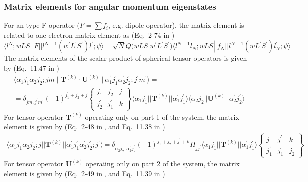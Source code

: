 \documentclass[a4paper,oneside,12pt]{extarticle}
\begin{document}
\subsubsection {Matrix elements for angular momentum eigenstates}
%
For an type-F operator ($F=\sum f_i$, e.g. dipole operator), the matrix element is related to one-electron matrix element as (Eq.~2-74 in \cite{Wybourne})
$$
\langle l^N; wLS || F || l^{N-1}(w^{\prime} L^{\prime} S^{\prime}) l^{\prime}; \psi \rangle = \sqrt{N}
Q(wLS|w^{\prime}L^{\prime} S^{\prime}) \langle l^{N-1} l_N; wLS || f_N || l^{N-1}(wL^{\prime} S^{\prime}) l^{\prime}_N; \psi \rangle
$$
The matrix elements of the scalar product of spherical tensor operators is given by (Eq.~11.47 in \cite{Cowan})
%
\begin{multline}
\langle \alpha_1 j_1 \alpha_2 j_2; jm \mid \mathbf{T}^{(k)}\cdot\mathbf{U}^{(k)} \mid \alpha_1^{\prime} j_1^{\prime} \alpha_2^{\prime} j_2^{\prime}; j^{\prime}m^{\prime} \rangle = \\ =
\delta_{jm, j^{\prime}m^{\prime}} (-1)^{j_1^{\prime} + j_2 + j}
\left \{
\begin{array}{ccc}
j_1 & j_2 & j \\
j_2^{\prime} & j_1^{\prime} & k
\end{array}
\right \}
\langle \alpha_1 j_1 || \mathbf{T}^{(k)} || \alpha_1^{\prime} j_1^{\prime} \rangle
\langle \alpha_2 j_2 || \mathbf{U}^{(k)} || \alpha_2^{\prime} j_2^{\prime} \rangle
\label{eq:Tk1}
\end{multline}
%
For tensor operator $\mathbf{T}^{(k)}$ operating only on part 1 of the system, the matrix element is given by (Eq.~2-48 in \cite{Wybourne}, and Eq.~11.38 in \cite{Cowan})
\begin{multline}
\langle \alpha_1 j_1 \alpha_2 j_2; j || \mathbf{T}^{(k)} || \alpha_1^{\prime} j_1^{\prime} \alpha_2^{\prime} j_2^{\prime}; j^{\prime} \rangle =
\delta_{\alpha_2 j_2, \alpha_2^{\prime} j_2^{\prime}} (-1)^{j_1 + j_2 + j^{\prime} + k} \Pi_{j j^{\prime}}
\langle \alpha_1 j_1 || \mathbf{T}^{(k)} || \alpha_1^{\prime} j_1^{\prime} \rangle
\left \{
\begin{array}{ccc}
j & j^{\prime} & k \\
j_1^{\prime} & j_1 & j_2
\end{array}
\right \}
\label{eq:Tk1}
\end{multline}
%
For tensor operator $\mathbf{U}^{(k)}$ operating only on part 2 of the system, the matrix element is given by (Eq.~2-49 in \cite{Wybourne}, and Eq.~11.39 in \cite{Cowan})
\end{document}
